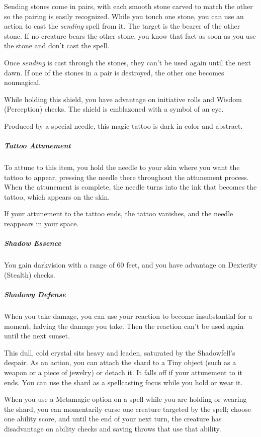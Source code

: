 \documentclass[10pt,a4paper,twoside,bg=print,twocolumn,openany,nodeprecatedcode]{dndbook}
\begin{document}
Sending stones come in pairs, with each smooth stone carved to match the other so the pairing is easily recognized. While you touch one stone, you can use an action to cast the \textit{sending} spell from it. The target is the bearer of the other stone. If no creature bears the other stone, you know that fact as soon as you use the stone and don't cast the spell.

Once \textit{sending} is cast through the stones, they can't be used again until the next dawn. If one of the stones in a pair is destroyed, the other one becomes nonmagical.

While holding this shield, you have advantage on initiative rolls and Wisdom (Perception) checks. The shield is emblazoned with a symbol of an eye.

Produced by a special needle, this magic tattoo is dark in color and abstract.

\subparagraph{Tattoo Attunement}
To attune to this item, you hold the needle to your skin where you want the tattoo to appear, pressing the needle there throughout the attunement process. When the attunement is complete, the needle turns into the ink that becomes the tattoo, which appears on the skin.

If your attunement to the tattoo ends, the tattoo vanishes, and the needle reappears in your space.

\subparagraph{Shadow Essence}
You gain darkvision with a range of 60 feet, and you have advantage on Dexterity (Stealth) checks.

\subparagraph{Shadowy Defense}
When you take damage, you can use your reaction to become insubstantial for a moment, halving the damage you take. Then the reaction can't be used again until the next sunset.

This dull, cold crystal sits heavy and leaden, saturated by the Shadowfell's despair. As an action, you can attach the shard to a Tiny object (such as a weapon or a piece of jewelry) or detach it. It falls off if your attunement to it ends. You can use the shard as a spellcasting focus while you hold or wear it.

When you use a Metamagic option on a spell while you are holding or wearing the shard, you can momentarily curse one creature targeted by the spell; choose one ability score, and until the end of your next turn, the creature has disadvantage on ability checks and saving throws that use that ability.
\end{document}
